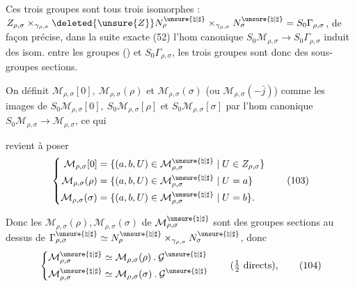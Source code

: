 Ces trois groupes sont  tous trois isomorphes :
$Z_{\rho,\sigma}\times_{\gamma_{\rho,\sigma}}
\deleted{\unsure{Z}}N_\rho^{\unsure{\natural|\sharp}}\times_{\gamma_{\rho,\sigma}}
N_\sigma^{\unsure{\natural|\sharp}}=S_0\Gamma_{\rho,\sigma}$,
de façon précise, dans la suite exacte (52)
l'hom canonique
$S_0\mathcal{M}_{\rho,\sigma}\longrightarrow S_0\Gamma_{\rho,\sigma}$
induit des isom. entre les groupes () et $S_0\Gamma_{\rho,\sigma}$, les trois groupes sont donc des sous-groupes sections.

On définit $\mathcal{M}_{\rho,\sigma}[0],\ \mathcal{M}_{\rho,\sigma}(\rho)$
et $\mathcal{M}_{\rho,\sigma}(\sigma)$ (ou $\mathcal{M}_{\rho,\sigma}(-\bar{j})$) comme les images de
$S_0\mathcal{M}_{\rho,\sigma}[0],\ S_0\mathcal{M}_{\rho,\sigma}[\rho]$ et
$S_0\mathcal{M}_{\rho,\sigma}[\sigma]$ par l'hom canonique
$S_0\mathcal{M}_{\rho,\sigma}\longrightarrow\mathcal{M}_{\rho,\sigma}$, ce qui




revient à poser
\[
\left\{\begin{aligned}
\mathcal{M}_{\rho,\sigma}[0]
&=\{(a,b,U)\in\mathcal{M}_{\rho,\sigma}^{\unsure{\natural|\sharp}}\mid U\in Z_{\rho,\sigma}\}\\
\mathcal{M}_{\rho,\sigma}(\rho)
&=\{(a,b,U)\in\mathcal{M}_{\rho,\sigma}^{\unsure{\natural|\sharp}}\mid U=a\}\\
\mathcal{M}_{\rho,\sigma}(\sigma)
&=\{(a,b,U)\in\mathcal{M}_{\rho,\sigma}^{\unsure{\natural|\sharp}}\mid U=b\}.
\end{aligned}\right.
\tag{103}
\]

Donc les  $\mathcal{M}_{\rho,\sigma}(\rho),\mathcal{M}_{\rho,\sigma}(\sigma)$ de $\mathcal{M}_{\rho,\sigma}^{\unsure{\natural|\sharp}}$ sont des groupes sections au dessus de $\Gamma_{\rho,\sigma}^{\unsure{\natural|\sharp}}\simeq N_\rho^{\unsure{\natural|\sharp}}\mathbin{\times}_{\gamma_{\rho,\sigma}}N_\sigma^{\unsure{\natural|\sharp}}$, donc
\[
\left\{\begin{aligned}
\mathcal{M}_{\rho,\sigma}^{\unsure{\natural|\sharp}}
&\simeq\mathcal{M}_{\rho,\sigma}(\rho)\mathbin{.}\mathcal{G}^{\unsure{\natural|\sharp}}\\
\mathcal{M}_{\rho,\sigma}^{\unsure{\natural|\sharp}}
&\simeq\mathcal{M}_{\rho,\sigma}(\sigma)\mathbin{.}\mathcal{G}^{\unsure{\natural|\sharp}}
\end{aligned}\right.
\qquad(\tfrac12\ \text{directs}),
\tag{104}
\]

